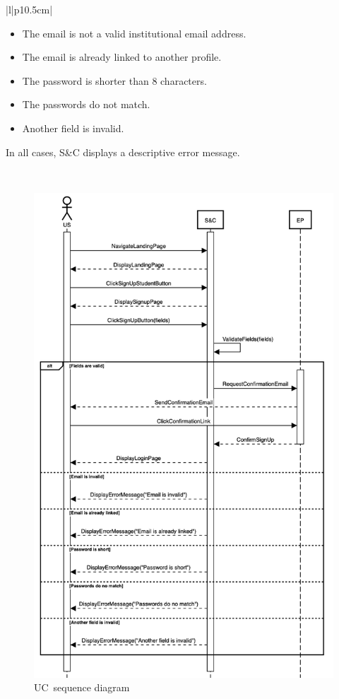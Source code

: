 \begin{longtable}{|l|p{10.5cm}|}
\begin{minipage}[t]{\linewidth}
            \begin{itemize}[leftmargin=*, label=\tiny\textbullet]
                \item The email is not a valid institutional email address.
                \item The email is already linked to another profile.
                \item The password is shorter than 8 characters.
                \item The passwords do not match.
                \item Another field is invalid.
            \end{itemize}
            In all cases, S\&C displays a descriptive error message.
            \vspace{10pt}
        \end{minipage} \\ \hline
\caption{Use case \theuc}
\end{longtable}

\begin{figure}
    \centering
    \includegraphics[width=13cm]{images/sequence-diagrams/student-signs-up.png}
    \caption{UC\theuc\ sequence diagram}
\end{figure}

